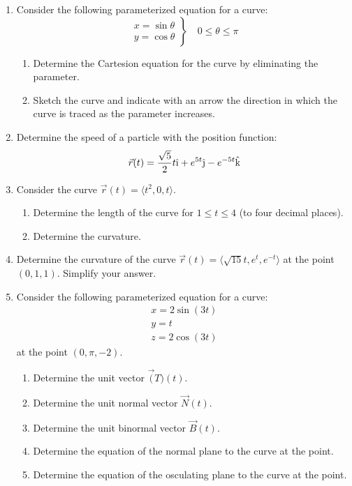 \documentclass[letterpaper,12pt,fleqn]{article}
\newcommand{\uv}[1]{\hat{#1}}
\newcommand{\iv}{\uv{\text{\i}}}
\newcommand{\jv}{\uv{\text{\j}}}
\newcommand{\kv}{\uv{\text{k}}}
\renewcommand{\O}{\theta}
\begin{document}
\begin{enumerate}
\item Consider the following parameterized equation for a curve:
  \[\left.\begin{array}{l}
  x = \sin\O \\
  y = \cos\O
  \end{array}\right\}\quad0\le\O\le\pi\]
  \begin{enumerate}
  \item Determine the Cartesion equation for the curve by eliminating the parameter.
  \item Sketch the curve and indicate with an arrow the direction in which the curve is traced as the parameter
    increases.
  \end{enumerate}

\item Determine the speed of a particle with the position function:
  \[\vec{r}(t)=\frac{\sqrt{5}}{2}t\iv+e^{5t}\jv-e^{-5t}\kv\]

\item Consider the curve \(\vec{r}(t)=\langle t^2,0,t\rangle\).
  \begin{enumerate}
  \item Determine the length of the curve for \(1\le t\le4\) (to four decimal places).
  \item Determine the curvature.
  \end{enumerate}

\item Determine the curvature of the curve \(\vec{r}(t)=\langle\sqrt{15}t,e^t,e^{-t}\rangle\) at the point
  \((0,1,1)\).  Simplify your answer.

\item Consider the following parameterized equation for a curve:
  \begin{gather*}
    x = 2\sin(3t) \\
    y = t \\
    z=2\cos(3t)
  \end{gather*}
  at the point \((0,\pi,-2)\).
  \begin{enumerate}
  \item Determine the unit vector \(\vec(T)(t)\).
  \item Determine the unit normal vector \(\vec{N}(t)\).
  \item Determine the unit binormal vector \(\vec{B}(t)\).
  \item Determine the equation of the normal plane to the curve at the point.
  \item Determine the equation of the osculating plane to the curve at the point.
  \end{enumerate}


\end{enumerate}
\end{document}
